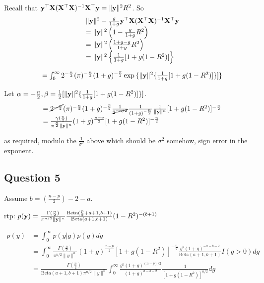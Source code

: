 \documentclass{article}[12pt]
\begin{document}
Recall that ${\bf y}^\top {\bf X}({\bf X}^\top {\bf X})^{-1} {\bf X}^\top {\bf y} = \| {\bf y} \|^2 R^2$. So
\begin{equation*}
\begin{array}{ll}
& \| {\bf y} \|^2 -\frac{g}{1 + g} {\bf y}^\top {\bf X} ({\bf X}^\top {\bf X})^{-1} {\bf X}^\top {\bf y} \\
&= \| {\bf y} \|^2 \left(1 - \frac{g}{1 + g}R^2 \right) \\
&= \| {\bf y} \|^2 \left(\frac{1 + g - g}{1 + g} R^2 \right) \\
&= \| {\bf y} \|^2 \left\{ \frac{1}{1 + g} [ 1 + g(1 - R^2) ] \right\}
\end{array}
\end{equation*}

\begin{equation*}
\begin{array}{ll}
&= \int_0^\infty 2^{-\frac{n}{2}} (\pi)^{-\frac{n}{2}} (1 + g)^{-\frac{p}{2}} \exp{\{ \| {\bf y}\|^2 \{ \frac{1}{1 + g} [1 + g(1 - R^2)] \}} ] \}
\end{array}
\end{equation*}

Let $\alpha = -\frac{n}{2}, \beta = \tfrac{1}{2} [\| {\bf y} \|^2 \{ \frac{1}{1 + g} [1 + g(1 - R^2)] \}]$.
\begin{equation*}
\begin{array}{ll}
&= \cancel{2^{- \frac{n}{2}}} (\pi)^{-\frac{n}{2}} (1 + g)^{-\frac{p}{2}} \frac{1}{\cancel{2^{-n/2}}} \frac{1}{(1 + g)^{-\frac{n}{2}}} \frac{1}{\| {\bf y} \|^n} [1 + g(1 - R^2)]^{-\frac{n}{2}} \\
&= \frac{\gamma(\frac{n}{2})}{\pi^{\frac{n}{2}} \| {\bf y} \|^n} (1 + g)^{\frac{n - p}{2}} [1 + g(1 - R^2)]^{-\frac{n}{2}}
\end{array}
\end{equation*}

as required, modulo the $\frac{1}{\sigma^2}$ above which should be $\sigma^2$ somehow, sign error in the
exponent.

\subsection{Question 5}

Assume $b = (\frac{n - p}{2}) - 2 - a$.

rtp: $p({\bf y}) = \frac{\Gamma(\frac{n}{2})}{\pi^{n/2} \| {\bf y} \|^n} \frac{\text{Beta}(\frac{p}{2} + a + 1, b + 1)}{\text{Beta}(a + 1, b + 1)} (1 - R^2)^{-(b + 1)}$

\begin{equation*}
\begin{array}{ll}
p(y) &= \int_0^\infty p(y|g) p(g) dg \\
&= \int_0^\infty \frac{\Gamma(\frac{n}{2})}{\pi^{n/2} \| y \|^n} (1 + g)^{\frac{n - p}{2}}[1 + g(1 - R^2)]^{-\frac{n}{2}} \frac{g^b (1 + g)^{-a - b - 2}}{\text{Beta}(a + 1, b + 1)} I(g > 0) dg \\
&= \frac{\Gamma(\frac{n}{2})}{\text{Beta}(a + 1, b + 1) \pi^{n/2} \| y \|^n}
\int_0^\infty \frac{g^b (1 + g)^{(n - p)/2}}{(1 + g)^{a - b - 2}} \frac{1}{[1 + g(1 - R^2)]^{n/2}} dg
\end{array}
\end{equation*}
\end{document}
